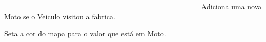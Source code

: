 ~\newline
~\newline
~\newline
~\newline
~\newline
~\newline
~\newline
~\newline
~\newline
~\newline
~\newline
~\newline
~\newline
~\newline
~\newline
~\newline
~\newline
~\newline
~\newline
~\newline
~\newline
~\newline
~\newline
~\newline
~\newline
~\newline
~\newline
~\newline
~\newline
~\newline
~\newline
~\newline
~\newline
 Adiciona uma nova \mbox{\hyperlink{class_moto}{Moto}} se o \mbox{\hyperlink{class_veiculo}{Veiculo}} visitou a fabrica.

Seta a cor do mapa para o valor que está em \mbox{\hyperlink{class_moto}{Moto}}.

